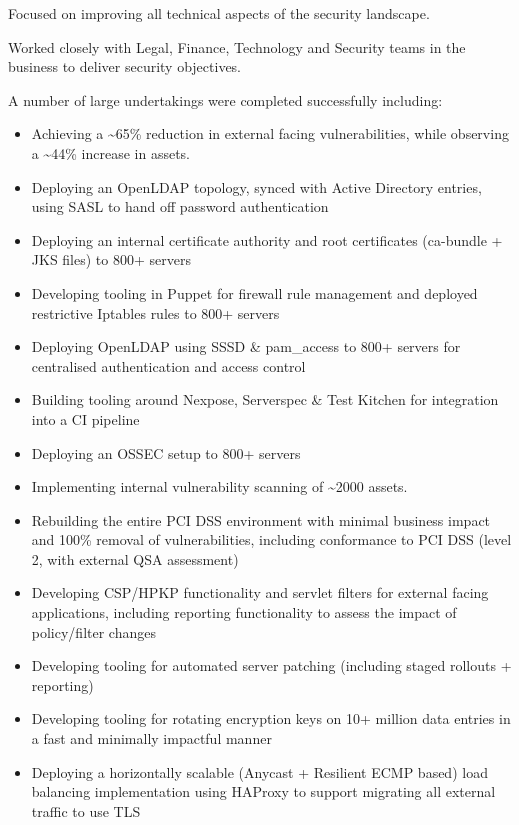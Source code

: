 Focused on improving all technical aspects of the security landscape.

Worked closely with Legal, Finance, Technology and Security teams in the
business to deliver security objectives.

A number of large undertakings were completed successfully including:

\begin{itemize}
\itemsep1pt\parskip0pt
\item
  Achieving a \textasciitilde{}65\% reduction in external facing
  vulnerabilities, while observing a \textasciitilde{}44\% increase in
  assets.
\item
  Deploying an OpenLDAP topology, synced with Active Directory entries,
  using SASL to hand off password authentication
\item
  Deploying an internal certificate authority and root certificates
  (ca-bundle + JKS files) to 800+ servers
\item
  Developing tooling in Puppet for firewall rule management and deployed
  restrictive Iptables rules to 800+ servers
\item
  Deploying OpenLDAP using SSSD \& pam\_access to 800+ servers for
  centralised authentication and access control
\item
  Building tooling around Nexpose, Serverspec \& Test Kitchen for
  integration into a CI pipeline
\item
  Deploying an OSSEC setup to 800+ servers
\item
  Implementing internal vulnerability scanning of \textasciitilde{}2000
  assets.
\item
  Rebuilding the entire PCI DSS environment with minimal business impact
  and 100\% removal of vulnerabilities, including conformance to PCI DSS
  (level 2, with external QSA assessment)
\item
  Developing CSP/HPKP functionality and servlet filters for external
  facing applications, including reporting functionality to assess the
  impact of policy/filter changes
\item
  Developing tooling for automated server patching (including staged
  rollouts + reporting)
\item
  Developing tooling for rotating encryption keys on 10+ million data
  entries in a fast and minimally impactful manner
\item
  Deploying a horizontally scalable (Anycast + Resilient ECMP based)
  load balancing implementation using HAProxy to support migrating all
  external traffic to use TLS
\end{itemize}

